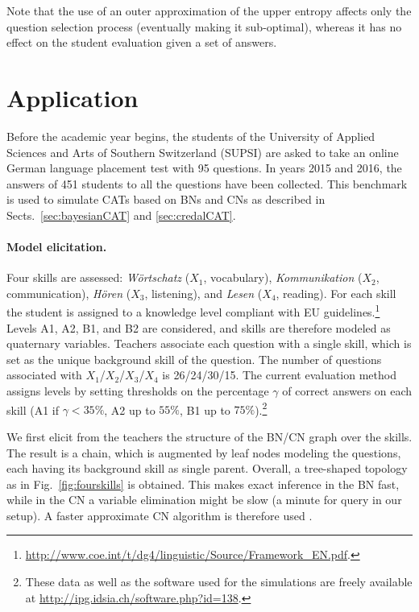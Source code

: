 \documentclass[runningheads]{llncs}
\begin{document}
	Note that the use of an outer approximation of the upper entropy affects only the 
	question selection process (eventually making it sub-optimal), whereas it has no effect 
	on the student evaluation given a set of answers.
	
	
	\section{Application}
	Before the academic year begins, the students of the University of Applied Sciences 
	and Arts of Southern Switzerland (SUPSI) are asked to take an online German language 
	placement test with 95 questions. In years 2015 and 2016, the answers of 451 students 
	to all the questions have been collected. This benchmark is used to simulate CATs 
	based on BNs and CNs as described in Sects.~\ref{sec:bayesianCAT} and 
	\ref{sec:credalCAT}.
	
	\paragraph{Model elicitation.}
	Four skills are assessed: \textit{W\"ortschatz} ($X_1$, vocabulary), 
	\textit{Kommunikation} ($X_2$, communication), \textit{H\"oren} ($X_3$, listening), and 
	\textit{Lesen} ($X_4$, reading). For each skill the student is assigned to a knowledge 
	level compliant with EU 
	guidelines.\footnote{\url{http://www.coe.int/t/dg4/linguistic/Source/Framework_EN.pdf}.}
	Levels A1, A2, B1, and B2 are considered, and skills are therefore modeled as 
	quaternary variables.
	Teachers associate each question with a single skill, which is set as the unique 
	background skill of the question. The number of questions associated with 
	$X_1$/$X_2$/$X_3$/$X_4$ is 26/24/30/15. The current evaluation method assigns 
	levels by setting thresholds on the percentage $\gamma$ of correct answers on each 
	skill (A1 if  $\gamma < 35\%$, A2 up to $55\%$, B1 up to $75\%$).\footnote{These data 
	as well as the software used for the simulations are freely available at 
	\url{http://ipg.idsia.ch/software.php?id=138}.}
	
	We first elicit from the teachers the structure of the BN/CN graph over the skills. The 
	result is a chain, which is augmented by leaf nodes modeling the questions, each 
	having its background skill as single parent. Overall, a tree-shaped topology as in 
	Fig.~\ref{fig:fourskills} is obtained. This makes exact inference in the BN fast, while in 
	the CN a variable elimination might be slow (a minute for query in our setup). A faster 
	approximate CN algorithm is therefore used \cite{antonucci2014e}.
	
\end{document}
